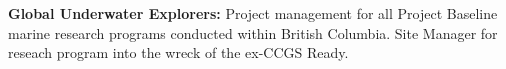 \documentclass[]{friggeri-cv} %
\begin{document}
\textbf{Global Underwater Explorers:} Project management for all Project Baseline marine research programs conducted within British Columbia. Site Manager for reseach program into the wreck of the ex-CCGS Ready.










\end{document}
